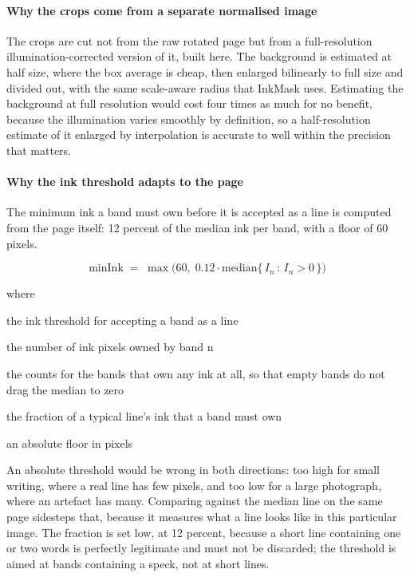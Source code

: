\paragraph{Why the crops come from a separate normalised image}
The crops are cut not from the raw rotated page but from a full-resolution illumination-corrected version of it, built here. The background is estimated at half size, where the box average is cheap, then enlarged bilinearly to full size and divided out, with the same scale-aware radius that InkMask uses. Estimating the background at full resolution would cost four times as much for no benefit, because the illumination varies smoothly by definition, so a half-resolution estimate of it enlarged by interpolation is accurate to well within the precision that matters.


\paragraph{Why the ink threshold adapts to the page}
The minimum ink a band must own before it is accepted as a line is computed from the page itself: 12 percent of the median ink per band, with a floor of 60 pixels.


\begin{equation}
\mathrm{minInk} \;=\; \max\big(60,\; 0.12 \cdot \mathrm{median}\{\, I_n \,:\, I_n > 0 \,\}\big)
\end{equation}

\noindent where
\begin{description}[leftmargin=2.4em,style=nextline,font=\normalfont\ttfamily]\setlength\itemsep{1pt}
  \item[{$\mathrm{minInk}$}] \normalfont the ink threshold for accepting a band as a line
  \item[{$I_n$}] \normalfont the number of ink pixels owned by band n
  \item[{$\{\,I_n : I_n > 0\,\}$}] \normalfont the counts for the bands that own any ink at all, so that empty bands do not drag the median to zero
  \item[{$0.12$}] \normalfont the fraction of a typical line's ink that a band must own
  \item[{$60$}] \normalfont an absolute floor in pixels
\end{description}
An absolute threshold would be wrong in both directions: too high for small writing, where a real line has few pixels, and too low for a large photograph, where an artefact has many. Comparing against the median line on the same page sidesteps that, because it measures what a line looks like in this particular image. The fraction is set low, at 12 percent, because a short line containing one or two words is perfectly legitimate and must not be discarded; the threshold is aimed at bands containing a speck, not at short lines.


